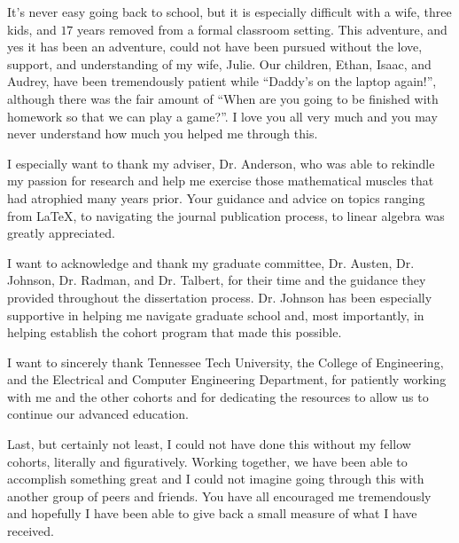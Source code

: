 
It's never easy going back to school, but it is especially difficult with a wife, three kids, and $17$ years removed from a formal classroom setting.  This adventure, and yes it has been an adventure, could not have been pursued without the love, support, and understanding of my wife, Julie.  Our children, Ethan, Isaac, and Audrey, have been tremendously patient while ``Daddy's on the laptop again!'', although there was the fair amount of ``When are you going to be finished with homework so that we can play a game?''.  I love you all very much and you may never understand how much you helped me through this.

I especially want to thank my adviser, Dr. Anderson, who was able to rekindle my passion for research and help me exercise those mathematical muscles that had atrophied many years prior.  Your guidance and advice on topics ranging from \LaTeX, to navigating the journal publication process, to linear algebra was greatly appreciated.  

I want to acknowledge and thank my graduate committee, Dr. Austen, Dr. Johnson, Dr. Radman, and Dr. Talbert, for their time and the guidance they provided throughout the dissertation process.  Dr. Johnson has been especially supportive in helping me navigate graduate school and, most importantly, in helping establish the cohort program that made this possible.

I want to sincerely thank Tennessee Tech University, the College of Engineering, and the Electrical and Computer Engineering Department, for patiently working with me and the other cohorts and for dedicating the resources to allow us to continue our advanced education. 

Last, but certainly not least, I could not have done this without my fellow cohorts, literally and figuratively.  Working together, we have been able to accomplish something great and I could not imagine going through this with another group of peers and friends.  You have all encouraged me tremendously and hopefully I have been able to give back a small measure of what I have received.

